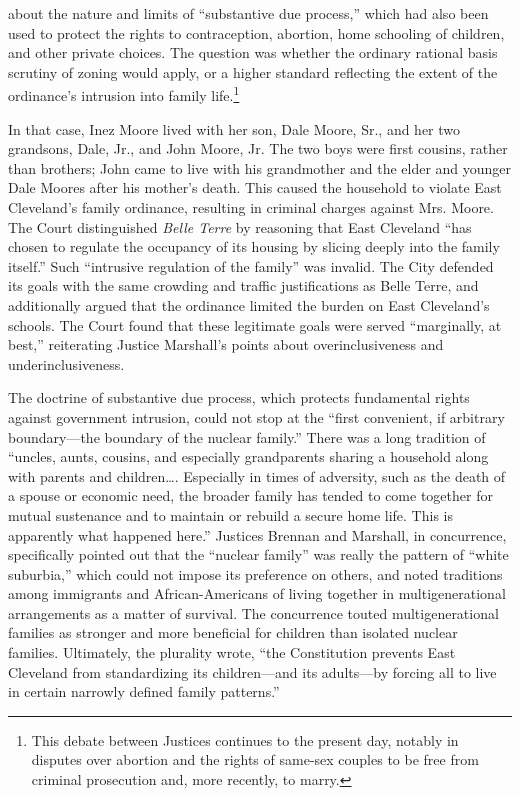about the nature and limits of ``substantive due process,'' which had also been
used to protect the rights to contraception, abortion, home schooling of
children, and other private choices. The question was whether the ordinary
rational basis scrutiny of zoning would apply, or a higher standard reflecting
the extent of the ordinance's intrusion into family life.\footnote{This debate
between Justices continues to the present day, notably in disputes over abortion
and the rights of same-sex couples to be free from criminal prosecution and,
more recently, to marry.}

In that case, Inez Moore lived with her son, Dale Moore, Sr., and her two
grandsons, Dale, Jr., and John Moore, Jr. The two boys were first cousins,
rather than brothers; John came to live with his grandmother and the elder and
younger Dale Moores after his mother's death. This caused the household to
violate East Cleveland's family ordinance, resulting in criminal charges against
Mrs. Moore. The Court distinguished \textit{Belle Terre} by reasoning that East
Cleveland ``has chosen to regulate the occupancy of its housing by slicing
deeply into the family itself.'' Such ``intrusive regulation of the family'' was
invalid. The City defended its goals with the same crowding and traffic
justifications as Belle Terre, and additionally argued that the ordinance
limited the burden on East Cleveland's schools. The Court found that these
legitimate goals were served ``marginally, at best,'' reiterating Justice
Marshall's points about overinclusiveness and underinclusiveness. 

The doctrine of substantive due process, which protects fundamental rights
against government intrusion, could not stop at the ``first convenient, if
arbitrary boundary---the boundary of the nuclear family.'' There was a long
tradition of ``uncles, aunts, cousins, and especially grandparents sharing a
household along with parents and children\ldots . Especially in times of
adversity, such as the death of a spouse or economic need, the broader family
has tended to come together for mutual sustenance and to maintain or rebuild a
secure home life. This is apparently what happened here.'' Justices Brennan and
Marshall, in concurrence, specifically pointed out that the ``nuclear family''
was really the pattern of ``white suburbia,'' which could not impose its
preference on others, and noted traditions among immigrants and
African-Americans of living together in multigenerational arrangements as a
matter of survival. The concurrence touted multigenerational families as
stronger and more beneficial for children than isolated nuclear families.
Ultimately, the plurality wrote, ``the Constitution prevents East Cleveland from
standardizing its children---and its adults---by forcing all to live in certain
narrowly defined family patterns.''

